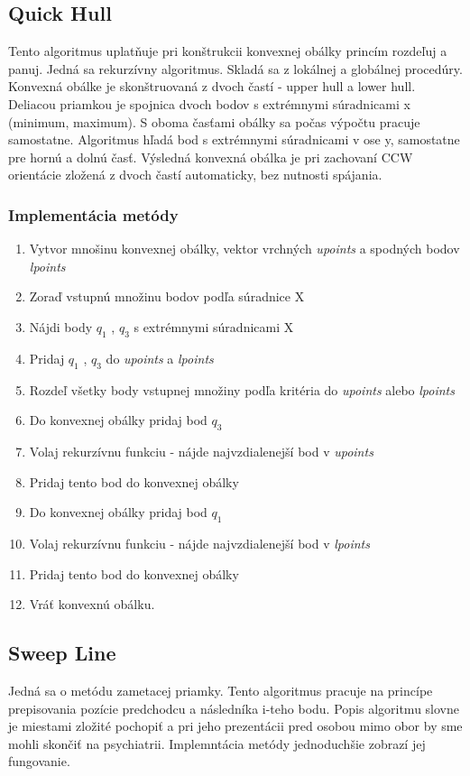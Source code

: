 \documentclass[12pt]{article}
\begin{document}
\subsection {Quick Hull}
Tento algoritmus uplatňuje pri konštrukcii konvexnej obálky princím rozdeľuj a panuj. Jedná sa rekurzívny algoritmus. Skladá sa z lokálnej a globálnej procedúry. Konvexná obálke je skonštruovaná z dvoch častí - upper hull a lower hull. Deliacou priamkou je spojnica dvoch bodov s extrémnymi súradnicami x (minimum, maximum). S oboma časťami obálky sa počas výpočtu pracuje samostatne. Algoritmus hľadá bod s extrémnymi súradnicami v ose y, samostatne pre hornú a dolnú časť. Výsledná konvexná obálka je pri zachovaní CCW orientácie zložená z dvoch častí automaticky, bez nutnosti spájania.

\subsubsection{Implementácia metódy}
\begin{enumerate}
\item Vytvor mnošinu konvexnej obálky, vektor vrchných \textit{upoints} a spodných bodov \textit{lpoints}
\item Zoraď vstupnú množinu bodov podľa súradnice X
\item Nájdi body $q_1$ , $q_3$  s extrémnymi súradnicami X 
\item  \hspace {1.5cm} Pridaj $q_1$ , $q_3$ do \textit{upoints} a \textit{lpoints}
\item Rozdeľ všetky body vstupnej množiny podľa kritéria do \textit{upoints} alebo \textit{lpoints}
\item Do konvexnej obálky pridaj bod $q_3$
\item  \hspace {1.5cm} Volaj rekurzívnu funkciu - nájde najvzdialenejší bod v \textit{upoints}
\item  \hspace {1.5cm} Pridaj tento bod do konvexnej obálky
\item Do konvexnej obálky pridaj bod $q_1$
\item  \hspace {1.5cm} Volaj rekurzívnu funkciu - nájde najvzdialenejší bod v \textit{lpoints}
\item  \hspace {1.5cm} Pridaj tento bod do konvexnej obálky
\item  Vráť konvexnú obálku.
\end{enumerate}

\subsection {Sweep Line}
Jedná sa o metódu zametacej priamky. Tento algoritmus pracuje na princípe prepisovania pozície predchodcu a následníka i-teho bodu. Popis algoritmu slovne je miestami zložité pochopiť a pri jeho prezentácii pred osobou mimo obor by sme mohli skončiť na psychiatrii. Implemntácia metódy jednoduchšie zobrazí jej fungovanie.
\end{document}
